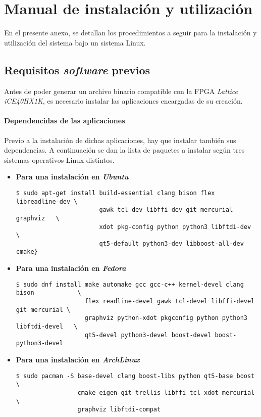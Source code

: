 \chapter{Manual de instalación y utilización}
\label{ch:manual}
En el presente anexo, se detallan los procedimientos a seguir para la instalación y utilización del sistema bajo un sistema Linux.

\section{Requisitos \emph{software} previos}
Antes de poder generar un archivo binario compatible con la FPGA \emph{Lattice iCE40HX1K}, es necesario instalar las aplicaciones encargadas de su creación.

\subsubsection{Dependencidas de las aplicaciones}
Previo a la instalación de dichas aplicaciones, hay que instalar también sus dependencias. A continuación se dan la lista de paquetes a instalar según tres sistemas operativos Linux distintos.

\begin{itemize}
    \item \textbf{Para una instalación en \emph{Ubuntu}} \\
    \begin{verbatim}
$ sudo apt-get install build-essential clang bison flex libreadline-dev \
                       gawk tcl-dev libffi-dev git mercurial graphviz   \
                       xdot pkg-config python python3 libftdi-dev       \
                       qt5-default python3-dev libboost-all-dev cmake}
    \end{verbatim}

    \item \textbf{Para una instalación en \emph{Fedora}} \\
    \begin{verbatim}
$ sudo dnf install make automake gcc gcc-c++ kernel-devel clang bison            \
                   flex readline-devel gawk tcl-devel libffi-devel git mercurial \
                   graphviz python-xdot pkgconfig python python3 libftdi-devel   \
                   qt5-devel python3-devel boost-devel boost-python3-devel
    \end{verbatim}

    \item \textbf{Para una instalación en \emph{ArchLinux}} \\
    \begin{verbatim}
$ sudo pacman -S base-devel clang boost-libs python qt5-base boost \
                 cmake eigen git trellis libffi tcl xdot mercurial \
                 graphviz libftdi-compat 
    \end{verbatim}
\end{itemize}

